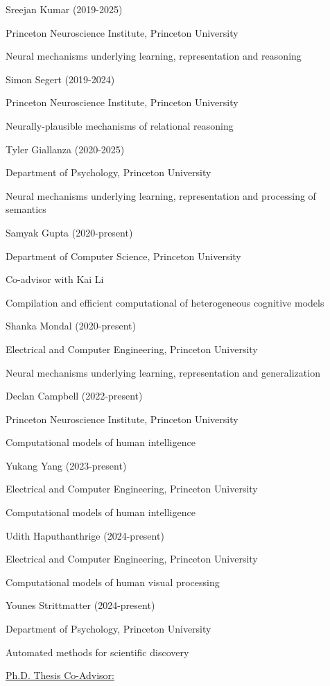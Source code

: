 \documentclass[10 pt]{article}
\begin{document}
Sreejan Kumar (2019-2025)

Princeton Neuroscience Institute, Princeton University

Neural mechanisms underlying learning, representation and reasoning
    \medskip

Simon Segert (2019-2024)

Princeton Neuroscience Institute, Princeton University

Neurally-plausible mechanisms of relational reasoning
    \medskip

Tyler Giallanza (2020-2025)

Department of Psychology, Princeton University

Neural mechanisms underlying learning, representation and processing of semantics
    \medskip

Samyak Gupta (2020-present)

Department of Computer Science, Princeton University

Co-advisor with Kai Li

Compilation and efficient computational of heterogeneous cognitive models
    \medskip

Shanka Mondal (2020-present)

Electrical and Computer Engineering, Princeton University

Neural mechanisms underlying learning, representation and generalization
    \medskip

Declan Campbell (2022-present)

Princeton Neuroscience Institute, Princeton University

Computational models of human intelligence
    \medskip

Yukang Yang (2023-present)

Electrical and Computer Engineering, Princeton University

Computational models of human intelligence
    \medskip


Udith Haputhanthrige (2024-present)

Electrical and Computer Engineering, Princeton University

Computational models of human visual processing
    \medskip

Younes Strittmatter (2024-present)

Department of Psychology, Princeton University

Automated methods for scientific discovery
    \medskip

{\fontsize{12pt}{16 pt}\selectfont \underline{Ph.D. Thesis Co-Advisor:}}
    \smallskip
\end{document}

